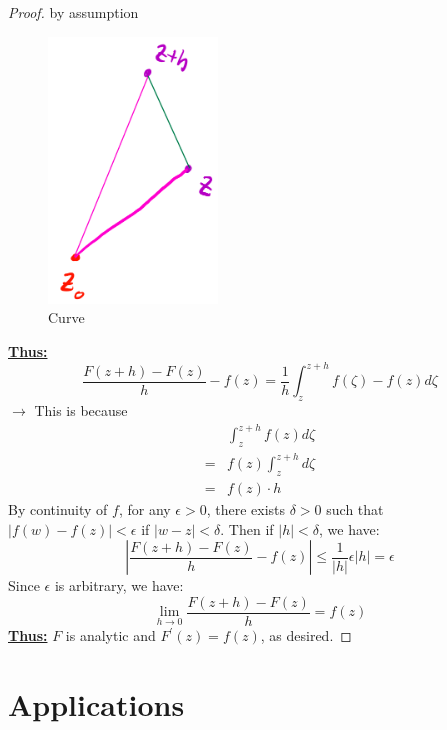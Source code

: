 \begin{proof}
    by assumption
    \begin{figure}[H]
        \centering
        \includegraphics[width=0.4\textwidth]{./LECTURE_9/curve.png}
        \caption{Curve}
        \label{fig:Curve}
    \end{figure}
    \underline{\textbf{Thus:}}
    \begin{equation*}
        \frac{F(z+h) - F(z)}{h} - f(z) = \frac{1}{h} \int_{z}^{z+h} f(\zeta) - f(z)d\zeta
    \end{equation*}
    $\rightarrow$ This is because \begin{align*}
          & \int_{z}^{z+h} f(z)d\zeta \\
        = & f(z)\int_{z}^{z+h} d\zeta \\
        = & f(z) \cdot h
    \end{align*}
    By continuity of $f$, for any $\epsilon > 0$, there exists $\delta > 0$ such that $|f(w) - f(z)| < \epsilon$ if $|w - z| < \delta$.
    Then if $|h| < \delta$, we have:
    \begin{equation*}
        \left| \frac{F(z+h) - F(z)}{h} - f(z) \right| \leq \frac{1}{|h|} \epsilon |h| = \epsilon
    \end{equation*}
    Since $\epsilon$ is arbitrary, we have:
    \begin{equation*}
        \lim_{h \to 0} \frac{F(z+h) - F(z)}{h} = f(z)
    \end{equation*}
    \underline{\textbf{Thus:}} $F$ is analytic and $F^{\prime}(z) = f(z)$, as desired.
\end{proof}

\section{Applications}

